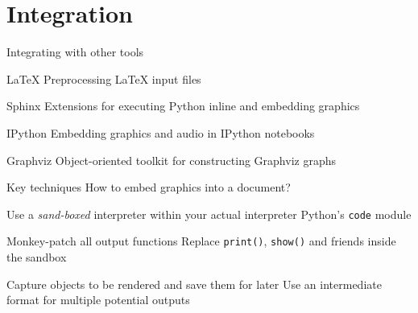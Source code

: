\section{Integration}

\begin{comment}
\begin{frame}
Documentation drives Abjad's development
\end{frame}
\end{comment}

\begin{frame}[fragile]{Integrating with other tools}
    \begin{block}{LaTeX}
        Preprocessing LaTeX input files
    \end{block}
    \begin{block}{Sphinx}
        Extensions for executing Python inline and embedding graphics
    \end{block}
    \begin{block}{IPython}
        Embedding graphics and audio in IPython notebooks
    \end{block}
    \begin{block}{Graphviz}
        Object-oriented toolkit for constructing Graphviz graphs
    \end{block}
\end{frame}

\begin{frame}[fragile]{Key techniques}
How to embed graphics into a document?

\begin{block}{Use a \emph{sand-boxed} interpreter within your actual interpreter}
Python's \texttt{code} module
\end{block}

\begin{block}{Monkey-patch all output functions}
Replace \texttt{print()}, \texttt{show()} and friends inside the sandbox
\end{block}

\begin{block}{Capture objects to be rendered and save them for later}
Use an intermediate format for multiple potential outputs
\end{block}
\end{frame}